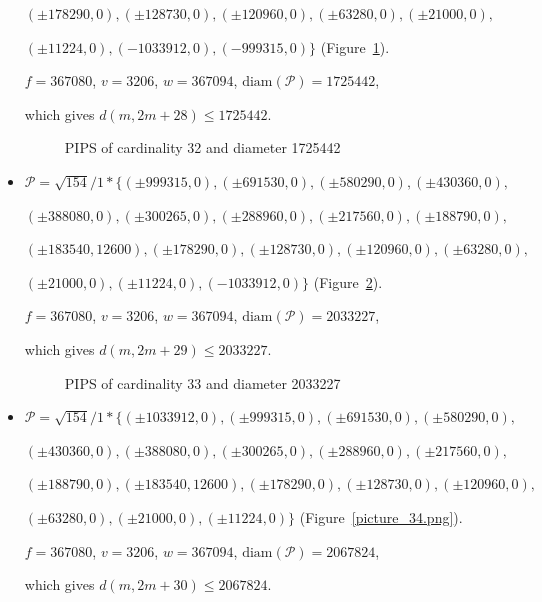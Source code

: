 \documentclass[12pt]{article}
\theoremstyle{theorem}
\theoremstyle{dfn}
\theoremstyle{remark}
\begin{document}
\begin{itemize}
$
(\pm 178290, 0),
(\pm 128730, 0),
(\pm 120960, 0),
(\pm 63280, 0),
(\pm 21000, 0),
$

$
(\pm 11224, 0),
(-1033912, 0),
(-999315, 0)\}
$
(Figure~\ref{picture_32.png}).

$f = 367080$, $v = 3206$, $w = 367094$, $\operatorname{diam(\mathcal{P})} = 1725442$,

which gives $d(m, 2m + 28) \leq 1725442$.


\begin{figure}[h!]
\parbox{1\linewidth}{\caption{PIPS of cardinality 32 and diameter 1725442}
\label{picture_32.png}}
\end{figure}


\item
$\mathcal{P}=\sqrt{154}/{1} * \{ (\pm 999315, 0),
(\pm 691530, 0),
(\pm 580290, 0),
(\pm 430360, 0),
$

$
(\pm 388080, 0),
(\pm 300265, 0),
(\pm 288960, 0),
(\pm 217560, 0),
(\pm 188790, 0),
$

$
(\pm 183540, 12600),
(\pm 178290, 0),
(\pm 128730, 0),
(\pm 120960, 0),
(\pm 63280, 0),
$

$
(\pm 21000, 0),
(\pm 11224, 0),
(-1033912, 0)\}
$
(Figure~\ref{picture_33.png}).

$f = 367080$, $v = 3206$, $w = 367094$, $\operatorname{diam(\mathcal{P})} = 2033227$,

which gives $d(m, 2m + 29) \leq 2033227$.


\begin{figure}[h!]
\parbox{1\linewidth}{\caption{PIPS of cardinality 33 and diameter 2033227}
\label{picture_33.png}}
\end{figure}


\item
$\mathcal{P}=\sqrt{154}/{1} * \{ (\pm 1033912, 0),
(\pm 999315, 0),
(\pm 691530, 0),
(\pm 580290, 0),
$

$
(\pm 430360, 0),
(\pm 388080, 0),
(\pm 300265, 0),
(\pm 288960, 0),
(\pm 217560, 0),
$

$
(\pm 188790, 0),
(\pm 183540, 12600),
(\pm 178290, 0),
(\pm 128730, 0),
(\pm 120960, 0),
$

$
(\pm 63280, 0),
(\pm 21000, 0),
(\pm 11224, 0)\}
$
(Figure~\ref{picture_34.png}).

$f = 367080$, $v = 3206$, $w = 367094$, $\operatorname{diam(\mathcal{P})} = 2067824$,

which gives $d(m, 2m + 30) \leq 2067824$.



\end{itemize}
\end{document}

